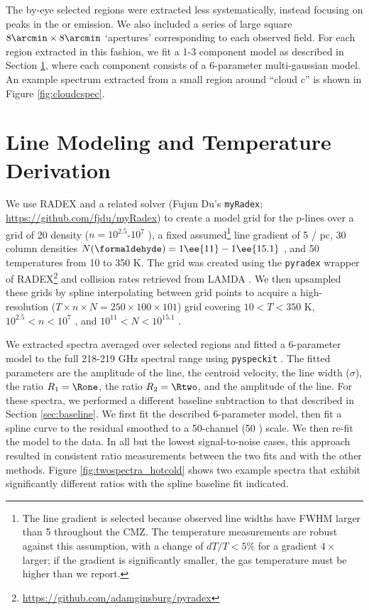 The by-eye selected regions were extracted less systematically, instead
focusing on peaks in the \threeohthree or \threetwoone emission.  We also
included a series of large square $8\arcmin \times 8\arcmin$ `apertures'
corresponding to each observed field.  For each region extracted in this
fashion, we fit a 1-3 component model as described in Section
\ref{sec:linemodeling}, where each component consists of a 6-parameter
multi-gaussian model.  An example spectrum extracted from a small region
around ``cloud c'' is shown in Figure \ref{fig:cloudcspec}.

\section{Line Modeling and Temperature Derivation}
\label{sec:linemodeling}
%
We use RADEX \citet{van-Der-Tak2007a} and a related solver (Fujun Du's
\texttt{myRadex}; \url{https://github.com/fjdu/myRadex}) to create a model grid
for the p-\formaldehyde lines over a grid of 20 density ($n=10^{2.5}$-$10^{7}$
\percc), a fixed assumed\footnote{The line gradient is selected because observed line widths have
FWHM larger than 5 \kms throughout the CMZ.  The temperature measurements are
robust against this assumption, with a change of $dT/T < 5\%$ for a gradient
$4\times$ larger; if the gradient is significantly smaller, the gas temperature
must be higher than we report.} line gradient of 5 \kms / pc, 30 \formaldehyde
column densities $N(\formaldehyde) = 1\ee{11}-1\ee{15.1}$ \persc, and 50
temperatures from 10 to 350 K.  The grid was created using the \texttt{pyradex}
wrapper of RADEX\footnote{\url{https://github.com/adamginsburg/pyradex}} and
collision rates retrieved from LAMDA \citep{Wiesenfeld2003a}.  We then
upsampled these grids by spline interpolating between grid points to acquire a
high-resolution ($T\times n \times N = 250\times100\times101$) grid covering
$10<T<350$ K, $10^{2.5} < n < 10^7$ \percc, and $10^{11} < N < 10^{15.1}$
\persc\perkmspc.

We extracted spectra averaged over selected regions and fitted
a 6-parameter model to the full 218-219 GHz spectral range using
\texttt{pyspeckit} \citep{Ginsburg2011c}.  The fitted parameters are the amplitude of the
\formaldehyde \threeohthree line, the centroid velocity, the line width
($\sigma$), the ratio $R_1 = \Rone$, the ratio $R_2 = \Rtwo$, and the
amplitude of the \methanol \fourtwotwo line.  For these spectra, we performed
a different baseline subtraction to that described in Section
\ref{sec:baseline}.  We first fit the described 6-parameter model, then fit a
spline curve to the residual smoothed to a 50-channel (50 \kms) scale.  We then
re-fit the model to the data.  In all but the lowest signal-to-noise cases,
this approach resulted in consistent ratio measurements between the two fits
and with the other methods.  Figure \ref{fig:twospectra_hotcold} shows two
example spectra that exhibit significantly different ratios with the spline
baseline fit indicated.

